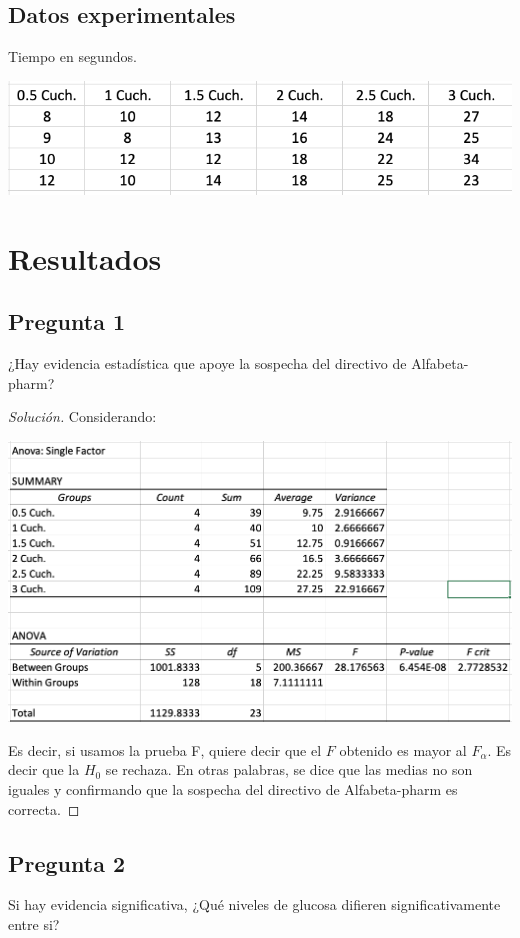 \documentclass[a4paper,12pt]{article}
\newenvironment{solution}
  {\renewcommand\qedsymbol{$\blacksquare$}\begin{proof}[Solución]}
  {\end{proof}}
\begin{document}
\subsection{Datos experimentales}
Tiempo en segundos.
\begin{center}
    \includegraphics[scale=0.5]{Imagenes/experimentales.png}
\end{center}
\section{Resultados}
\subsection{Pregunta 1}
¿Hay evidencia estadística que apoye la sospecha del directivo de Alfabeta-pharm?
\begin{solution}
   Considerando:
   \begin{center}
       \includegraphics[scale=0.3]{Imagenes/ANOVA.png}
   \end{center}
   Es decir, si usamos la prueba F, quiere decir que el $F$ obtenido es mayor al $F_\alpha$. Es decir que la $H_0$ se rechaza. En otras palabras, se dice que las medias no son iguales y confirmando que la sospecha del directivo de Alfabeta-pharm es correcta. 
\end{solution}

\subsection{Pregunta 2}
Si hay evidencia significativa, ¿Qué niveles de glucosa difieren significativamente entre si?
\end{document}

